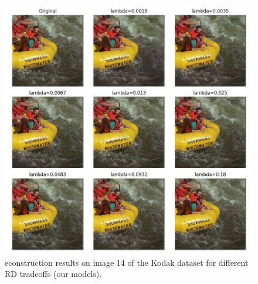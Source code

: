 \begin{figure}
    \centering
    \includegraphics[width=15cm]{../img/bdpsnr_kodak_14.png}
    \caption[econstruction results on image 14 of the Kodak dataset for different RD tradeoffs (our models).]{econstruction results on image 14 of the Kodak dataset for different RD tradeoffs (our models).}
    \label{appendix:bdpsnr_1:b}
\end{figure}

